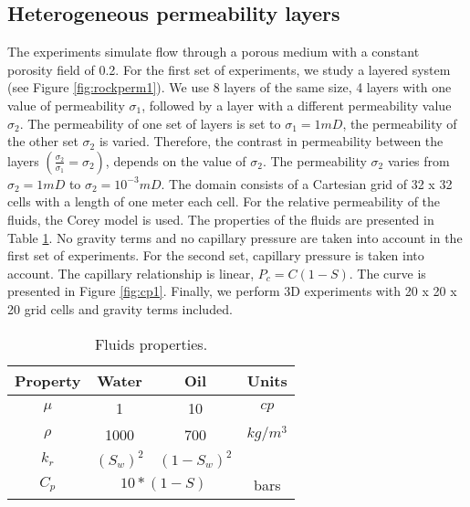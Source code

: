 \documentclass[12pt]{article}
\begin{document}
\subsection*{Heterogeneous permeability layers}
The experiments simulate flow through a porous medium with a constant porosity field of 0.2.
For the first set of experiments, we study a layered system (see Figure \ref{fig:rockperm1}). We use 8 layers of the same size, 
4 layers with one value of permeability $\sigma_1$, followed by a layer with a different permeability value $\sigma_2$. The permeability of one set of layers is set to $\sigma_1=1mD$, the permeability of the other set $\sigma_2$ is varied. 
Therefore, the contrast in permeability between the layers $(\frac{\sigma_2}{\sigma_1}=\sigma_2)$,
depends on the value of $\sigma_2$.
The permeability $\sigma_2$ varies from $\sigma_2=1mD$ to $\sigma_2=10^{-3}mD$. 
The domain consists of a Cartesian grid of 32 x 32 cells with a length of one meter each cell. For the relative permeability of the fluids, the Corey model is used. The properties of the fluids are presented in Table \ref{table:fluids}. No gravity terms and no capillary pressure are taken into account in the first set of experiments.
For the second set, capillary pressure is taken into account. The capillary relationship is linear, $P_c = C(1-S)$. The curve is presented in Figure \ref{fig:cp1}. 
Finally, we perform 3D experiments with 20 x 20 x 20 grid cells and gravity terms included. 
\begin{table}[!ht]
\hspace{1cm}
\begin{minipage}{.9\textwidth}%
\centering
\begin{tabular}{ |c|c|c|c|} 
\hline
Property&Water&Oil&Units\\
\hline
$\mu$&     1&    10 & $cp$  \\  
$\rho$& 1000& 700& $kg/m^3$\\
$k_r$&$(S_w)^2$&   $(1-S_w)^2$ &  \\
\hline
 $C_p$&\multicolumn{2}{|c|}{$10*(1-S)$}&bars\\
\hline
\end{tabular}
\caption{Fluids properties.}\label{table:fluids}
\end{minipage} \hspace{1cm} 
\end{table} 
\end{document}
